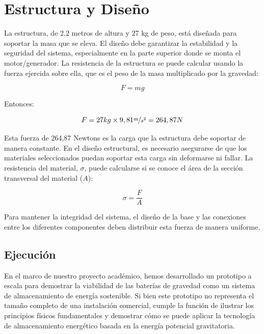         \section{Estructura y Diseño}
        
        La estructura, de 2,2 metros de altura y 27 kg de peso, está diseñada para soportar la masa que se eleva. El diseño debe garantizar la estabilidad y la seguridad del sistema, especialmente en la parte superior donde se monta el motor/generador. La resistencia de la estructura se puede calcular usando la fuerza ejercida sobre ella, que es el peso de la masa multiplicado por la gravedad:\par

        \begin{equation*}
            F = mg
        \end{equation*}

        Entonces:\par

        \begin{equation}
            F = 27kg \times 9,81 \nicefrac{m}{s^2} = 264,87N
        \end{equation}

        Esta fuerza de 264,87 Newtons es la carga que la estructura debe soportar de manera constante. En el diseño estructural, es necesario asegurarse de que los materiales seleccionados puedan soportar esta carga sin deformarse ni fallar. La resistencia del material, $\sigma$, puede calcularse si se conoce el área de la sección transversal del material ($A$):\par

        \begin{equation}
            \sigma = \frac{F}{A}
        \end{equation}

        Para mantener la integridad del sistema, el diseño de la base y las conexiones entre los diferentes componentes deben distribuir esta fuerza de manera uniforme.\par

        \subsection{Ejecución}
            En el marco de nuestro proyecto académico, hemos desarrollado un prototipo a escala para demostrar la viabilidad de las baterías de gravedad como un sistema de almacenamiento de energía sostenible. Si bien este prototipo no representa el tamaño completo de una instalación comercial, cumple la función de ilustrar los principios físicos fundamentales y demostrar cómo se puede aplicar la tecnología de almacenamiento energético basada en la energía potencial gravitatoria.\par

